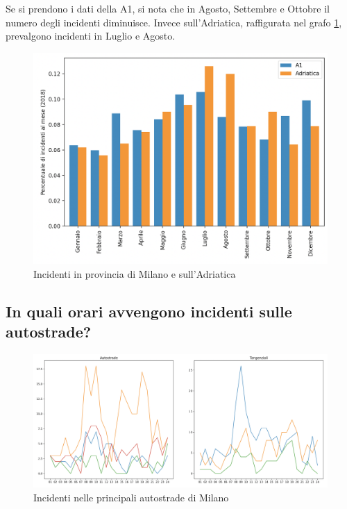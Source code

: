 \documentclass[a4paper]{report}
\begin{document}
Se si prendono i dati della A1, si nota 
che in Agosto, Settembre e Ottobre il numero degli incidenti diminuisce.
Invece sull'Adriatica, raffigurata nel grafo \ref{fig:milano-adriatica}, 
prevalgono incidenti in Luglio e Agosto.

\begin{figure}
    \includegraphics[width=\linewidth]{../src/incidenti/incidenti_aci/autostrade/milano_adriatica.png}
    \caption{Incidenti in provincia di Milano e sull'Adriatica}
    \label{fig:milano-adriatica}
\end{figure}


\subsection{In quali orari avvengono incidenti sulle autostrade?}

\begin{figure}
    \includegraphics[width=\linewidth]{../src/incidenti/incidenti_aci/autostrade/tangenziali_autostrade.png}
    \caption{Incidenti nelle principali autostrade di Milano}
    \label{fig:tangenziali-autostrade}
\end{figure}
\end{document}
